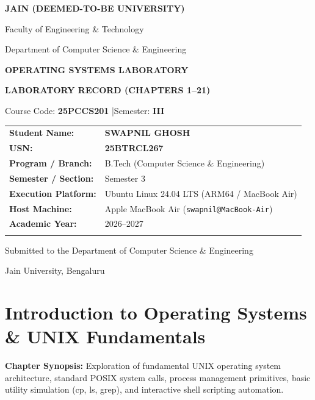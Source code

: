 \documentclass[11pt,a4paper]{report}
\begin{document}
\begin{titlepage}
\centering
\vspace*{0.5cm}
{\Large \textbf{JAIN (DEEMED-TO-BE UNIVERSITY)} \par}
\vspace{0.2cm}
{\normalsize Faculty of Engineering \& Technology \par}
{\normalsize Department of Computer Science \& Engineering \par}

\vspace{2.2cm}
{\LARGE \textbf{OPERATING SYSTEMS LABORATORY} \par}
\vspace{0.4cm}
{\large \textbf{LABORATORY RECORD (CHAPTERS 1--21)} \par}
\vspace{0.3cm}
{\normalsize Course Code: \textbf{25PCCS201} \quad|\quad Semester: \textbf{III} \par}

\vspace{1.8cm}
\begin{tabular}{@{}ll@{}}
\toprule
\addlinespace[6pt]
\textbf{Student Name:} & \textbf{SWAPNIL GHOSH} \\
\addlinespace[4pt]
\textbf{USN:} & \textbf{25BTRCL267} \\
\addlinespace[4pt]
\textbf{Program / Branch:} & B.Tech (Computer Science \& Engineering) \\
\addlinespace[4pt]
\textbf{Semester / Section:} & Semester 3 \\
\addlinespace[4pt]
\textbf{Execution Platform:} & Ubuntu Linux 24.04 LTS (ARM64 / MacBook Air) \\
\addlinespace[4pt]
\textbf{Host Machine:} & Apple MacBook Air (\texttt{swapnil@MacBook-Air}) \\
\addlinespace[4pt]
\textbf{Academic Year:} & 2026--2027 \\
\addlinespace[6pt]
\bottomrule
\end{tabular}

\vfill
{\small Submitted to the Department of Computer Science \& Engineering \par}
{\small Jain University, Bengaluru \par}
\vspace{0.5cm}
\end{titlepage}

\setcounter{page}{1}
\tableofcontents
\clearpage
\chapter{Introduction to Operating Systems \& UNIX Fundamentals}
\noindent\textbf{Chapter Synopsis:} Exploration of fundamental UNIX operating system architecture, standard POSIX system calls, process management primitives, basic utility simulation (cp, ls, grep), and interactive shell scripting automation.
\end{document}
